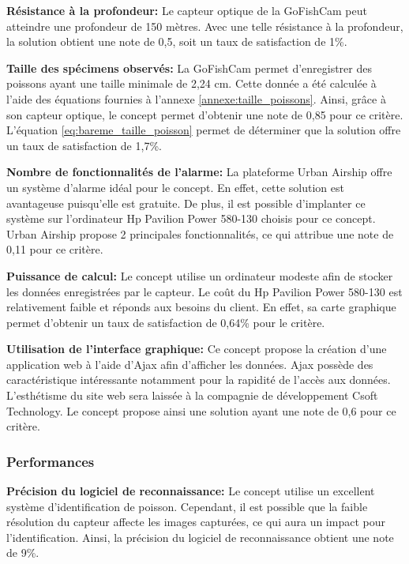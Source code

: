 \textbf{Résistance à la profondeur:} Le capteur optique de la GoFishCam peut atteindre une profondeur de 150 mètres. Avec une telle résistance à la profondeur, la solution obtient une note de 0,5, soit un taux de satisfaction de 1\%. \vspace{5mm}

\textbf{Taille des spécimens observés:} La GoFishCam permet d'enregistrer des poissons ayant une taille minimale de 2,24 cm. Cette donnée a été calculée à l'aide des équations fournies à l'annexe \ref{annexe:taille_poissons}. Ainsi, grâce à son capteur optique, le concept permet d'obtenir une note de 0,85 pour ce critère. L'équation \ref{eq:bareme_taille_poisson} permet de déterminer que la solution offre un taux de satisfaction de 1,7\%.
\vspace{5mm}

\textbf{Nombre de fonctionnalités de l'alarme:} La plateforme Urban Airship offre un système d'alarme idéal pour le concept. En effet, cette solution est avantageuse puisqu'elle est gratuite. De plus, il est possible d'implanter ce système sur l'ordinateur Hp Pavilion Power 580-130 choisis pour ce concept. Urban Airship propose 2 principales fonctionnalités, ce qui attribue une note de 0,11 pour ce critère.
\vspace{5mm}

\textbf{Puissance de calcul:} Le concept utilise un ordinateur modeste afin de stocker les données enregistrées par le capteur. Le coût du Hp Pavilion Power 580-130 est relativement faible et réponds aux besoins du client. En effet, sa carte graphique permet d'obtenir un taux de satisfaction de 0,64\% pour le critère. 
\vspace{5mm}

\textbf{Utilisation de l'interface graphique:} Ce concept propose la création d'une application web à l'aide d'Ajax afin d'afficher les données. Ajax possède des caractéristique intéressante notamment pour la rapidité de l'accès aux données. L'esthétisme du site web sera laissée à la compagnie de développement Csoft Technology. Le concept propose ainsi une solution ayant une note de 0,6 pour ce critère.


\subsubsection{Performances}

\textbf{Précision du logiciel de reconnaissance:} Le concept utilise un excellent système d'identification de poisson. Cependant, il est possible que la faible résolution du capteur affecte les images capturées, ce qui aura un impact pour l'identification. Ainsi, la précision du logiciel de reconnaissance obtient une note de 9\%. \vspace{5mm}

